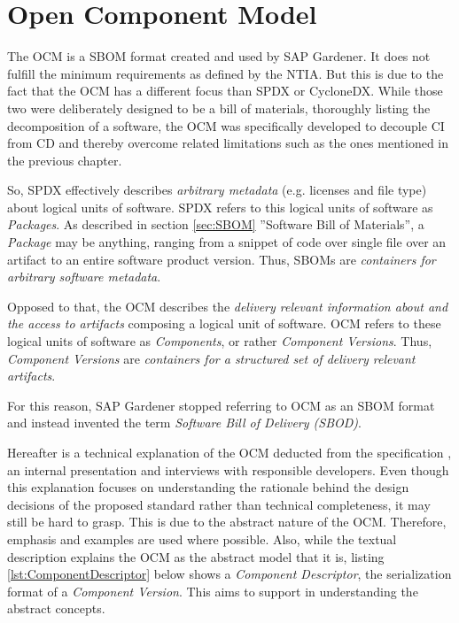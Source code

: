 \section{Open Component Model} \label{sec:Open Component Model}
The OCM is a SBOM format created and used by SAP Gardener. It does not fulfill the minimum requirements as defined by the NTIA. But this is due to the fact that the OCM has a different focus than SPDX or CycloneDX. While those two were deliberately designed to be a bill of materials, thoroughly listing the decomposition of a software, the OCM was specifically developed to decouple CI from CD and thereby overcome related limitations such as the ones mentioned in the previous chapter.\par 
So, SPDX effectively describes \emph{arbitrary metadata} (e.g. licenses and file type) about logical units of software. SPDX refers to this logical units of software as \emph{Packages}. As described in section \ref{sec:SBOM} ''Software Bill of Materials'', a \emph{Package} may be anything, ranging from a snippet of code over single file over an artifact to an entire software product version. Thus, SBOMs are \emph{containers for arbitrary software metadata}.\par
Opposed to that, the OCM describes the \emph{delivery relevant information about and the access to artifacts} composing a logical unit of software. OCM refers to these logical units of software as \emph{Components}, or rather \emph{Component Versions}. Thus, \emph{Component Versions} are  \emph{containers for a structured set of delivery relevant artifacts}.\par 
For this reason, SAP Gardener stopped referring to OCM as an SBOM format and instead invented the term \emph{Software Bill of Delivery (SBOD)}.\par
Hereafter is a technical explanation of the OCM deducted from the specification \cite{OCMSpec}, an internal presentation \cite{OCMInternalPresentation} and interviews with responsible developers. Even though this explanation focuses on understanding the rationale behind the design decisions of the proposed standard rather than technical completeness, it may still be hard to grasp. This is due to the abstract nature of the OCM. Therefore, emphasis and examples are used where possible. Also, while the textual description explains the OCM as the abstract model that it is, listing \ref{lst:ComponentDescriptor} below shows a \emph{Component Descriptor}, the serialization format of a \emph{Component Version}. This aims to support in understanding the abstract concepts.

